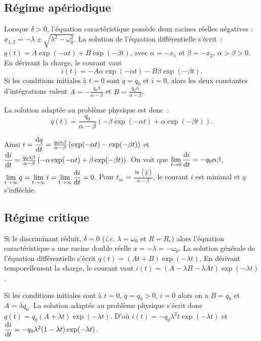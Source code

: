 	\subsection{Régime apériodique}
		Lorsque $\delta >0$, l'équation caractéristique possède deux racines réelles négatives : $x_{1, 2} = -\lambda \pm \sqrt{\lambda^2 -\omega_0^2}$. La solution de l'équation différentielle s'écrit~: $q(t) = A\exp(-\alpha t) + B\exp(-\beta t)$, avec $\alpha = -x_1$ et $\beta=-x_2$, $\alpha>\beta>0$. En dérivant la charge, le courant vaut
		\begin{equation}
			i(t) = -A\alpha \exp{(-\alpha t)} - B\beta \exp{(-\beta t)}.
		\end{equation}
		Si les conditions initiales à $t=0$ sont $q=q_0$ et $i=0$, alors les deux constantes d'intégrations valent $A = -\frac{q_0 \beta}{\alpha - \beta}$ et $B = \frac{q_0 \alpha}{\alpha - \beta}$.

		La solution adaptée au problème physique est donc~:
		\begin{equation}
			q(t) = \frac{q_0}{\alpha - \beta}\left(-\beta\exp(-\alpha t) + \alpha\exp(-\beta t )\right).
		\end{equation}

		Ainsi $i = \dfrac{\mathrm{d} q}{\mathrm{d} t} = \frac{q_0 \alpha \beta}{\alpha - \beta}\left(\exp(-\alpha t) - \exp(-\beta t )\right)$ et $\dfrac{\mathrm{d} i}{\mathrm{d} t} = \frac{q_0 \alpha \beta}{\alpha - \beta}\left(-\alpha\exp(-\alpha t) +\beta\exp(-\beta t )\right)$. On voit que $\lim\limits_{t \to 0} \dfrac{\mathrm{d} i}{\mathrm{d} t} = -q_0 \alpha\beta$, $\lim\limits_{t \to \infty} q = \lim\limits_{t \to \infty} i = \lim\limits_{t \to \infty} \dfrac{\mathrm{d} i}{\mathrm{d} t} = 0$. Pour $t_m = \frac{\ln\left(\frac{\alpha}{\beta}\right)}{\alpha-\beta}$, le courant $i$ est minimal et $q$ s'infléchie. %
	\subsection{Régime critique}

		Si le discriminant réduit, $\delta = 0$ (\emph{i.e.} $\lambda = \omega_0$ et $R = R_c$) alors l'équation caractéristique a une racine double réelle $x = -\lambda = -\omega_0$. La solution générale de l'équation différentielle s'écrit $q(t) = (At+B)\exp(-\lambda t)$. En dérivant temporellement la charge, le courant vaut $i(t) = (A-\lambda B-\lambda A t)\exp(-\lambda t)$.

		Si les conditions initiales sont à $t=0$, $q=q_0>0$, $i=0$ alors on a $B=q_0$ et $A=\lambda q_0$. La solution adaptée au problème physique s'écrit donc $q(t) = q_0(A+\lambda t)\exp(-\lambda t)$. D'où $i(t) = -q_0\lambda^2 t\exp(-\lambda t)$ et $\dfrac{\mathrm{d} i}{\mathrm{d} t} = -q_0\lambda^2(1-\lambda t)\exp(-\lambda t)$.

